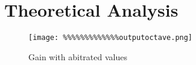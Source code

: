 \section{Theoretical Analysis}
\label{sec:analysis}


\begin{figure} [!htb] 
  \texttt{[image: \%\%\%\%\%\%\%\%\%\%\%\%\%outputoctave.png]}
  \caption{Gain with abitrated values}
  \label{fig:theoplots}
  \endminipage\hfill
\end{figure}

\FloatBarrier




